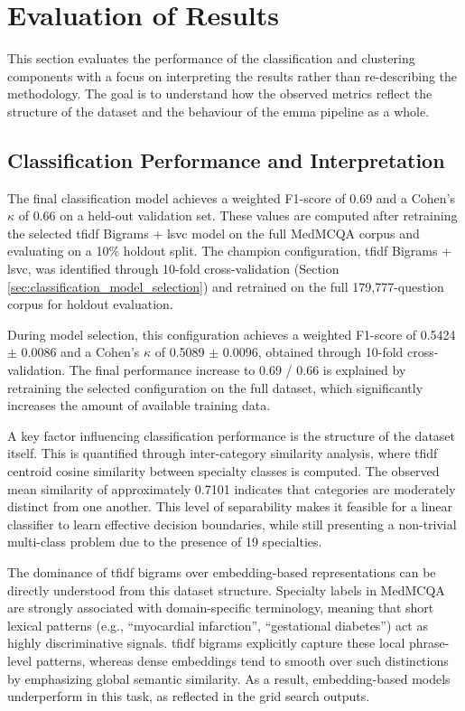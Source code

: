 \chapter{Evaluation of Results}
\label{ch:evaluation}

This section evaluates the performance of the classification and clustering components with a focus on interpreting the results rather than re-describing the methodology. The goal is to understand how the observed metrics reflect the structure of the dataset and the behaviour of the \gls{emma} pipeline as a whole. 

\section{Classification Performance and Interpretation}
The final classification model achieves a weighted F1-score of 0.69 and a Cohen's $\kappa$ of 0.66 on a held-out validation set. These values are computed after retraining the selected \gls{tfidf} Bigrams + \gls{lsvc} model on the full MedMCQA corpus and evaluating on a 10\% holdout split. The champion configuration, \gls{tfidf} Bigrams + \gls{lsvc}, was identified through 10-fold cross-validation (Section \ref{sec:classification_model_selection}) and retrained on the full 179,777-question corpus for holdout evaluation. 

During model selection, this configuration achieves a weighted F1-score of 0.5424 $\pm$ 0.0086 and a Cohen's $\kappa$ of 0.5089 $\pm$ 0.0096, obtained through 10-fold cross-validation. The final performance increase to 0.69 / 0.66 is explained by retraining the selected configuration on the full dataset, which significantly increases the amount of available training data. 

A key factor influencing classification performance is the structure of the dataset itself. This is quantified through inter-category similarity analysis, where \gls{tfidf} centroid cosine similarity between specialty classes is computed. The observed mean similarity of approximately 0.7101 indicates that categories are moderately distinct from one another. This level of separability makes it feasible for a linear classifier to learn effective decision boundaries, while still presenting a non-trivial multi-class problem due to the presence of 19 specialties.

The dominance of \gls{tfidf} bigrams over embedding-based representations can be directly understood from this dataset structure. Specialty labels in MedMCQA are strongly associated with domain-specific terminology, meaning that short lexical patterns (e.g., ``myocardial infarction'', ``gestational diabetes'') act as highly discriminative signals. \gls{tfidf} bigrams explicitly capture these local phrase-level patterns, whereas dense embeddings tend to smooth over such distinctions by emphasizing global semantic similarity. As a result, embedding-based models underperform in this task, as reflected in the grid search outputs. 

